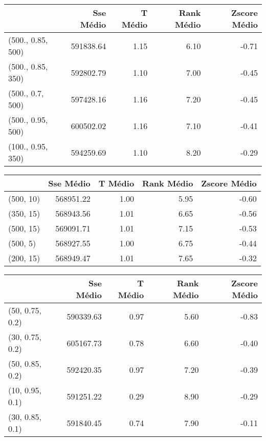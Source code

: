 \begin{table}
\centering
\label{tab:train_5_bests_Simulat}
\begin{tabular}{lrrrr}
\toprule
{} &  Sse Médio &  T Médio &  Rank Médio &  Zscore Médio \\
\midrule
(500., 0.85, 500) &  591838.64 &     1.15 &        6.10 &         -0.71 \\
(500., 0.85, 350) &  592802.79 &     1.10 &        7.00 &         -0.45 \\
(500., 0.7, 500)  &  597428.16 &     1.16 &        7.20 &         -0.45 \\
(500., 0.95, 500) &  600502.02 &     1.16 &        7.10 &         -0.41 \\
(100., 0.95, 350) &  594259.69 &     1.10 &        8.20 &         -0.29 \\
\bottomrule
\end{tabular}
\end{table}
\begin{table}
\centering
\label{tab:train_5_bests_GRASP}
\begin{tabular}{lrrrr}
\toprule
{} &  Sse Médio &  T Médio &  Rank Médio &  Zscore Médio \\
\midrule
(500, 10) &  568951.22 &     1.00 &        5.95 &         -0.60 \\
(350, 15) &  568943.56 &     1.01 &        6.65 &         -0.56 \\
(500, 15) &  569091.71 &     1.01 &        7.15 &         -0.53 \\
(500, 5)  &  568927.55 &     1.00 &        6.75 &         -0.44 \\
(200, 15) &  568949.47 &     1.01 &        7.65 &         -0.32 \\
\bottomrule
\end{tabular}
\end{table}
\begin{table}
\centering
\label{tab:train_5_bests_Genetic}
\begin{tabular}{lrrrr}
\toprule
{} &  Sse Médio &  T Médio &  Rank Médio &  Zscore Médio \\
\midrule
(50, 0.75, 0.2) &  590339.63 &     0.97 &        5.60 &         -0.83 \\
(30, 0.75, 0.2) &  605167.73 &     0.78 &        6.60 &         -0.40 \\
(50, 0.85, 0.2) &  592420.35 &     0.97 &        7.20 &         -0.39 \\
(10, 0.95, 0.1) &  591251.22 &     0.29 &        8.90 &         -0.29 \\
(30, 0.85, 0.1) &  591840.45 &     0.74 &        7.90 &         -0.11 \\
\bottomrule
\end{tabular}
\end{table}

